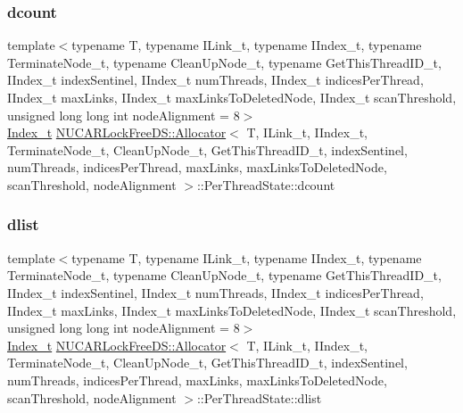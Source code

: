 \subsubsection{\texorpdfstring{dcount}{dcount}}
{\footnotesize\ttfamily template$<$typename T, typename I\+Link\+\_\+t, typename I\+Index\+\_\+t, typename Terminate\+Node\+\_\+t, typename Clean\+Up\+Node\+\_\+t, typename Get\+This\+Thread\+I\+D\+\_\+t, I\+Index\+\_\+t index\+Sentinel, I\+Index\+\_\+t num\+Threads, I\+Index\+\_\+t indices\+Per\+Thread, I\+Index\+\_\+t max\+Links, I\+Index\+\_\+t max\+Links\+To\+Deleted\+Node, I\+Index\+\_\+t scan\+Threshold, unsigned long long int node\+Alignment = 8$>$ \\
\mbox{\hyperlink{class_n_u_c_a_r_lock_free_d_s_1_1_allocator_a2776cca35e8343bf5007bd8b6f3a3f8f}{Index\+\_\+t}} \mbox{\hyperlink{class_n_u_c_a_r_lock_free_d_s_1_1_allocator}{N\+U\+C\+A\+R\+Lock\+Free\+D\+S\+::\+Allocator}}$<$ T, I\+Link\+\_\+t, I\+Index\+\_\+t, Terminate\+Node\+\_\+t, Clean\+Up\+Node\+\_\+t, Get\+This\+Thread\+I\+D\+\_\+t, index\+Sentinel, num\+Threads, indices\+Per\+Thread, max\+Links, max\+Links\+To\+Deleted\+Node, scan\+Threshold, node\+Alignment $>$\+::Per\+Thread\+State\+::dcount}

\mbox{\label{class_n_u_c_a_r_lock_free_d_s_1_1_allocator_1_1_per_thread_state_a70b267fa370752120e752af9651467d7}} 
\subsubsection{\texorpdfstring{dlist}{dlist}}
{\footnotesize\ttfamily template$<$typename T, typename I\+Link\+\_\+t, typename I\+Index\+\_\+t, typename Terminate\+Node\+\_\+t, typename Clean\+Up\+Node\+\_\+t, typename Get\+This\+Thread\+I\+D\+\_\+t, I\+Index\+\_\+t index\+Sentinel, I\+Index\+\_\+t num\+Threads, I\+Index\+\_\+t indices\+Per\+Thread, I\+Index\+\_\+t max\+Links, I\+Index\+\_\+t max\+Links\+To\+Deleted\+Node, I\+Index\+\_\+t scan\+Threshold, unsigned long long int node\+Alignment = 8$>$ \\
\mbox{\hyperlink{class_n_u_c_a_r_lock_free_d_s_1_1_allocator_a2776cca35e8343bf5007bd8b6f3a3f8f}{Index\+\_\+t}} \mbox{\hyperlink{class_n_u_c_a_r_lock_free_d_s_1_1_allocator}{N\+U\+C\+A\+R\+Lock\+Free\+D\+S\+::\+Allocator}}$<$ T, I\+Link\+\_\+t, I\+Index\+\_\+t, Terminate\+Node\+\_\+t, Clean\+Up\+Node\+\_\+t, Get\+This\+Thread\+I\+D\+\_\+t, index\+Sentinel, num\+Threads, indices\+Per\+Thread, max\+Links, max\+Links\+To\+Deleted\+Node, scan\+Threshold, node\+Alignment $>$\+::Per\+Thread\+State\+::dlist}

